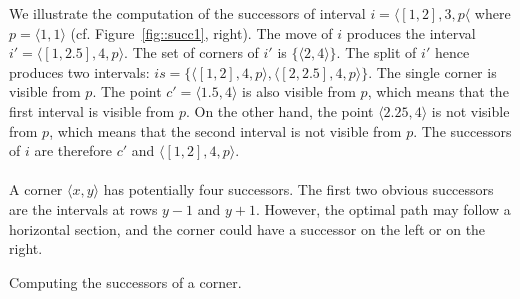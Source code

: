 We illustrate the computation of the successors 
of interval $i = \langle [1,2],3,p\langle$ 
where $p = \langle1,1\rangle$ 
(cf. Figure~\ref{fig::succ1}, right).  
The move of $i$ produces 
the interval $i' = \langle [1,2.5],4,p\rangle$.  
The set of corners of $i'$ is $\{\langle 2,4\rangle\}$.  
The split of $i'$ hence produces two intervals: 
$is = \{
\langle [1,2],4,p\rangle,  
\langle [2,2.5],4,p\rangle
\}$.  
The single corner is visible from $p$.  
The point $c' = \langle 1.5,4\rangle$ is also visible from $p$, 
which means that the first interval is visible from $p$.  
On the other hand, the point $\langle 2.25,4\rangle$ 
is not visible from $p$, 
which means that the second interval is not visible from $p$.  
The successors of $i$ are therefore $c'$ 
and $\langle [1,2],4,p\rangle$.  

\paragraph*{}

A corner $\langle x,y\rangle$ has potentially four successors.  
The first two obvious successors 
are the intervals at rows $y-1$ and $y+1$.  
However, the optimal path may follow a horizontal section, 
and the corner could have a successor on the left or on the right.  

\begin{algorithm}
  
  \caption{Computing the successors of a corner.}
  \label{algo::successorsofacorner}
\end{algorithm}



\begin{figure}[tb]
  \begin{center}
  \end{center}
\end{figure}
